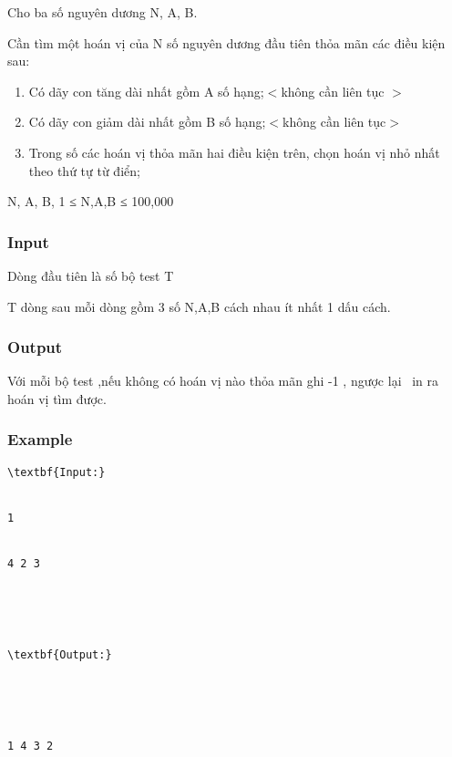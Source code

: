 



   Cho ba số nguyên dương N, A, B.  

   Cần tìm một hoán vị của N số nguyên dương đầu tiên thỏa mãn các điều kiện sau:  
\begin{enumerate}
	\item     Có dãy con tăng dài nhất gồm A số hạng;$<$không cần liên tục $>$   
	\item     Có dãy con giảm dài nhất gồm B số hạng;$<$không cần liên tục$>$   
	\item     Trong số các hoán vị thỏa mãn hai điều kiện trên, chọn hoán vị nhỏ nhất theo thứ tự từ điển;   
\end{enumerate}

   N, A, B, 1 ≤ N,A,B ≤ 100,000  

\subsubsection{   Input  }

   Dòng đầu tiên là số bộ test T  

   T dòng sau mỗi dòng gồm 3 số N,A,B cách nhau ít nhất 1 dấu cách.  

\subsubsection{   Output  }

   Với mỗi bộ test ,nếu không có hoán vị nào thỏa mãn ghi -1 , ngược lại  in ra hoán vị tìm được.  

\subsubsection{   Example  }
\begin{verbatim}
\textbf{Input:}


1


4 2 3





\textbf{Output:}





1 4 3 2


\end{verbatim}
